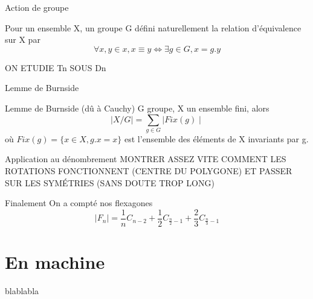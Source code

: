 \documentclass[french,xcolor=dvipsnames]{beamer}
\begin{document}
		\begin{frame}{Action de groupe}
			\begin{definition}
			Pour un ensemble X, un groupe G défini naturellement la relation d'équivalence sur X par
			\[
				\forall x,y \in x, x \equiv y \Leftrightarrow \exists g \in G, x=g.y
			\]
			\end{definition}
			
			ON ETUDIE Tn SOUS Dn
		\end{frame}
		\begin{frame}{Lemme de Burnside}
			\begin{theorem}{Lemme de Burnside (dû à Cauchy)}
				G groupe, X un ensemble fini, alors
				\[
				\mid X/G \mid = \sum_{g\in G}{\mid Fix(g) \mid}
				\]
				où $Fix(g) = \{x\in X, g.x = x\}$ est l'ensemble des éléments de X invariants par g.
			\end{theorem}
		\end{frame}
		
		\begin{frame}{Application au dénombrement}
			MONTRER ASSEZ VITE COMMENT LES ROTATIONS FONCTIONNENT (CENTRE DU POLYGONE) ET PASSER SUR LES SYMÉTRIES (SANS DOUTE TROP LONG)
		\end{frame}
		
		\begin{frame}{Finalement}
		On a compté nos flexagones
		{\Large
		\[
			\mid F_{n} \mid = \frac{1}{n}C_{n-2} + \frac{1}{2}C_{\frac{n}{2}-1} + \frac{2}{3}C_{\frac{n}{3}-1}
		\]
		}
		\end{frame}		
		
		
	\section{En machine}
	blablabla
\end{document}
